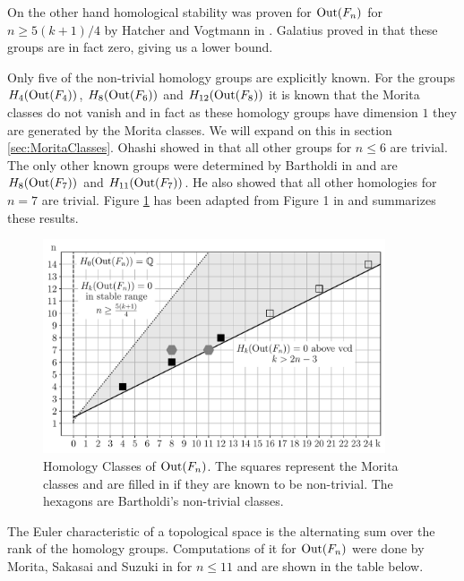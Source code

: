 On the other hand homological stability was proven for $\operatorname{Out}(F_{n})$ for $n \geq 5 (k+1) / 4$ by Hatcher and Vogtmann in \cite{hatcher04,hatcher98}.
Galatius proved in \cite{galatius11} that these groups are in fact zero, giving us a lower bound.

Only five of the non-trivial homology groups are explicitly known.
For the groups $H_{4}(\operatorname{Out}(F_{4}))$, $H_{8}(\operatorname{Out}(F_{6}))$ and $H_{12}(\operatorname{Out}(F_{8}))$ it is known 
that the Morita classes do not vanish and in fact as these homology groups have dimension $1$ they are generated by the Morita classes.
We will expand on this in section \ref{sec:MoritaClasses}.
Ohashi showed in \cite{ohashi08} that all other groups for $n \leq 6$ are trivial. 
The only other known groups were determined by Bartholdi in \cite{bartholdi16} and are
$H_{8}(\operatorname{Out}(F_{7}))$ and $H_{11}(\operatorname{Out}(F_{7}))$. He also showed that all other homologies for $n = 7$ are trivial.
Figure \ref{fig:homologyOfOutFn} has been adapted from Figure 1 in \cite{conant16} and summarizes these results.

\begin{figure}[htbp]
	\centering
	\captionsetup{width=0.9\textwidth}
	\includegraphics[width=0.9\textwidth]{./Images/OutFnHomology.pdf}
	\caption{Homology Classes of $\operatorname{Out}(F_{n})$. The squares represent the  Morita classes and are filled in if they are known to be non-trivial.
		The hexagons are Bartholdi's non-trivial classes.}
	\label{fig:homologyOfOutFn}
\end{figure}

The Euler characteristic of a topological space is the alternating sum over the rank of the homology groups.
Computations of it for $\operatorname{Out}(F_{n})$ were done by Morita, Sakasai and Suzuki in \cite{morita15moduli,morita15euler} for $n \leq 11$ and are shown in the table below.

